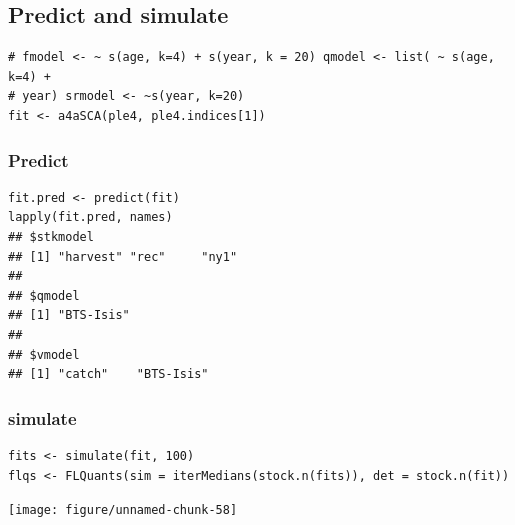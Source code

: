 \documentclass[a4paper,english,10pt]{article}\usepackage[]{graphicx}\usepackage[]{color}
\makeatletter
\newenvironment{kframe}{%
 \def\at@end@of@kframe{}%
 \ifinner\ifhmode%
  \def\at@end@of@kframe{\end{minipage}}%
  \begin{minipage}{\columnwidth}%
 \fi\fi%
 \def\FrameCommand##1{\hskip\@totalleftmargin \hskip-\fboxsep
 \colorbox{shadecolor}{##1}\hskip-\fboxsep
     \hskip-\linewidth \hskip-\@totalleftmargin \hskip\columnwidth}%
 \MakeFramed {\advance\hsize-\width
   \@totalleftmargin\z@ \linewidth\hsize
   \@setminipage}}%
 {\par\unskip\endMakeFramed%
 \at@end@of@kframe}
\newenvironment{knitrout}{}{} %
\makeatother
\begin{document}
\subsection{Predict and simulate}

\begin{knitrout}
\color{fgcolor}\begin{kframe}
\begin{verbatim}
# fmodel <- ~ s(age, k=4) + s(year, k = 20) qmodel <- list( ~ s(age, k=4) +
# year) srmodel <- ~s(year, k=20)
fit <- a4aSCA(ple4, ple4.indices[1])
\end{verbatim}
\end{kframe}
\end{knitrout}


\subsubsection{Predict}

\begin{knitrout}
\color{fgcolor}\begin{kframe}
\begin{verbatim}
fit.pred <- predict(fit)
lapply(fit.pred, names)
## $stkmodel
## [1] "harvest" "rec"     "ny1"    
## 
## $qmodel
## [1] "BTS-Isis"
## 
## $vmodel
## [1] "catch"    "BTS-Isis"
\end{verbatim}
\end{kframe}
\end{knitrout}


\subsubsection{simulate}

\begin{knitrout}
\color{fgcolor}\begin{kframe}
\begin{verbatim}
fits <- simulate(fit, 100)
flqs <- FLQuants(sim = iterMedians(stock.n(fits)), det = stock.n(fit))
\end{verbatim}
\end{kframe}
\end{knitrout}


\begin{knitrout}
\color{fgcolor}

{\centering \texttt{[image: figure/unnamed-chunk-58]} 

}



\end{knitrout}
\end{document}
